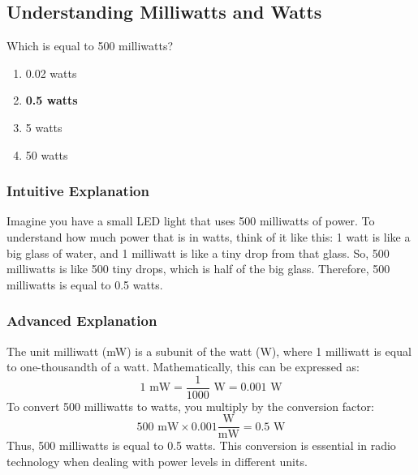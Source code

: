 \subsection{Understanding Milliwatts and Watts}
\label{T5B05}

\begin{tcolorbox}[colback=gray!10!white,colframe=black!75!black,title=T5B05]
Which is equal to 500 milliwatts?
\begin{enumerate}[noitemsep]
    \item 0.02 watts
    \item \textbf{0.5 watts}
    \item 5 watts
    \item 50 watts
\end{enumerate}
\end{tcolorbox}

\subsubsection*{Intuitive Explanation}
Imagine you have a small LED light that uses 500 milliwatts of power. To understand how much power that is in watts, think of it like this: 1 watt is like a big glass of water, and 1 milliwatt is like a tiny drop from that glass. So, 500 milliwatts is like 500 tiny drops, which is half of the big glass. Therefore, 500 milliwatts is equal to 0.5 watts.

\subsubsection*{Advanced Explanation}
The unit milliwatt (mW) is a subunit of the watt (W), where 1 milliwatt is equal to one-thousandth of a watt. Mathematically, this can be expressed as:
\[
1 \text{ mW} = \frac{1}{1000} \text{ W} = 0.001 \text{ W}
\]
To convert 500 milliwatts to watts, you multiply by the conversion factor:
\[
500 \text{ mW} \times 0.001 \frac{\text{W}}{\text{mW}} = 0.5 \text{ W}
\]
Thus, 500 milliwatts is equal to 0.5 watts. This conversion is essential in radio technology when dealing with power levels in different units.